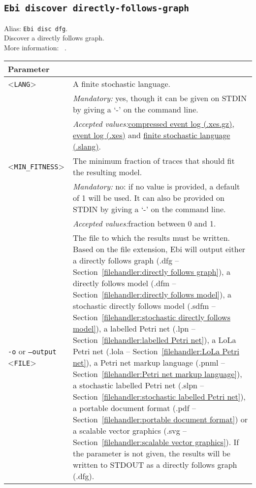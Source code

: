 {\subsection{\texttt{Ebi discover directly-follows-graph}}
\label{command:Ebi discover directly-follows-graph}
Alias: \texttt{Ebi disc dfg}.\\
Discover a directly follows graph.\\
More information: ~\cite{DBLP:conf/icpm/LeemansPW19}.\\
\begin{tabularx}{\linewidth}{lX}
\toprule
Parameter \\\midrule
<\texttt{LANG}>&A finite stochastic language.\\
&\textit{Mandatory:} \quad yes, though it can be given on STDIN by giving a `-' on the command line.\\
&\textit{Accepted values:}\quad \hyperref[filehandler:compressed event log]{compressed event log (.xes.gz)}, \hyperref[filehandler:event log]{event log (.xes)} and \hyperref[filehandler:finite stochastic language]{finite stochastic language (.slang)}.\\
<\texttt{MIN\_FITNESS}>&The minimum fraction of traces that should fit the resulting model.\\
&\textit{Mandatory:} \quad no: if no value is provided, a default of 1 will be used. It can also be provided on STDIN by giving a `-' on the command line.\\
&\textit{Accepted values:}\quad fraction between 0 and 1.\\
\texttt{-o} or \texttt{--output} <\texttt{FILE}> &
The file to which the results must be written. Based on the file extension, Ebi will output either a directly follows graph (.dfg -- Section~\ref{filehandler:directly follows graph}), a directly follows model (.dfm -- Section~\ref{filehandler:directly follows model}), a stochastic directly follows model (.sdfm -- Section~\ref{filehandler:stochastic directly follows model}), a labelled Petri net (.lpn -- Section~\ref{filehandler:labelled Petri net}), a LoLa Petri net (.lola -- Section~\ref{filehandler:LoLa Petri net}), a Petri net markup language (.pnml -- Section~\ref{filehandler:Petri net markup language}), a stochastic labelled Petri net (.slpn -- Section~\ref{filehandler:stochastic labelled Petri net}), a portable document format (.pdf -- Section~\ref{filehandler:portable document format}) or a scalable vector graphics (.svg -- Section~\ref{filehandler:scalable vector graphics}).
If the parameter is not given, the results will be written to STDOUT as a directly follows graph (.dfg).\\

\end{tabularx}}
